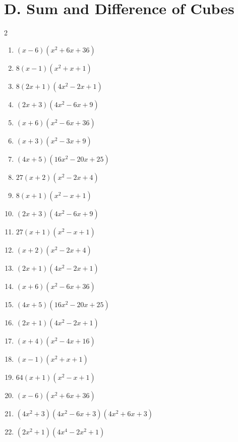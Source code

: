 \documentclass[11pt,oneside]{book}
\begin{document}
\section*{D. Sum and Difference of Cubes}
\begin{multicols}{2}
\begin{enumerate}[leftmargin=*,label=\textbf{D\arabic*.},itemsep=0.45\baselineskip]
\item $ \left(x - 6\right) \left(x^{2} + 6 x + 36\right) $
\item $ 8 \left(x - 1\right) \left(x^{2} + x + 1\right) $
\item $ 8 \left(2 x + 1\right) \left(4 x^{2} - 2 x + 1\right) $
\item $ \left(2 x + 3\right) \left(4 x^{2} - 6 x + 9\right) $
\item $ \left(x + 6\right) \left(x^{2} - 6 x + 36\right) $
\item $ \left(x + 3\right) \left(x^{2} - 3 x + 9\right) $
\item $ \left(4 x + 5\right) \left(16 x^{2} - 20 x + 25\right) $
\item $ 27 \left(x + 2\right) \left(x^{2} - 2 x + 4\right) $
\item $ 8 \left(x + 1\right) \left(x^{2} - x + 1\right) $
\item $ \left(2 x + 3\right) \left(4 x^{2} - 6 x + 9\right) $
\item $ 27 \left(x + 1\right) \left(x^{2} - x + 1\right) $
\item $ \left(x + 2\right) \left(x^{2} - 2 x + 4\right) $
\item $ \left(2 x + 1\right) \left(4 x^{2} - 2 x + 1\right) $
\item $ \left(x + 6\right) \left(x^{2} - 6 x + 36\right) $
\item $ \left(4 x + 5\right) \left(16 x^{2} - 20 x + 25\right) $
\item $ \left(2 x + 1\right) \left(4 x^{2} - 2 x + 1\right) $
\item $ \left(x + 4\right) \left(x^{2} - 4 x + 16\right) $
\item $ \left(x - 1\right) \left(x^{2} + x + 1\right) $
\item $ 64 \left(x + 1\right) \left(x^{2} - x + 1\right) $
\item $ \left(x - 6\right) \left(x^{2} + 6 x + 36\right) $
\item $ \left(4 x^{2} + 3\right) \left(4 x^{2} - 6 x + 3\right) \left(4 x^{2} + 6 x + 3\right) $
\item $ \left(2 x^{2} + 1\right) \left(4 x^{4} - 2 x^{2} + 1\right) $

\end{enumerate}
\end{multicols}
\end{document}

